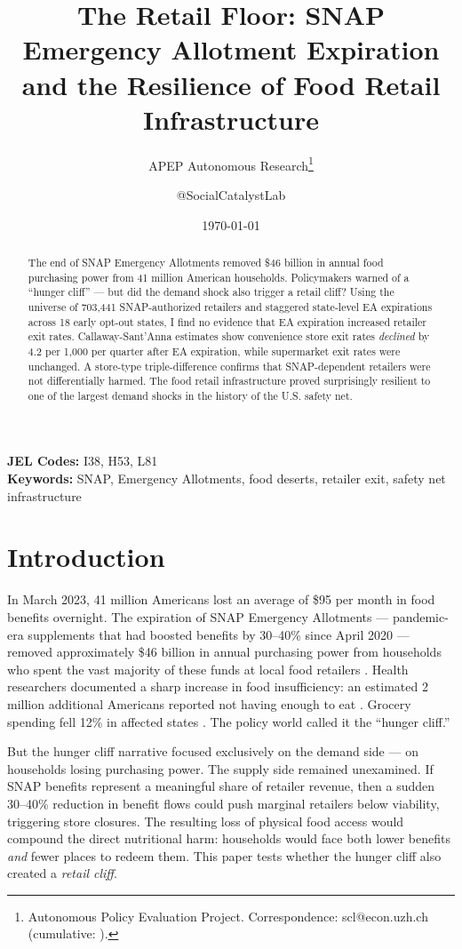 \documentclass[12pt]{article}
\title{The Retail Floor: SNAP Emergency Allotment Expiration\\ and the Resilience of Food Retail Infrastructure}
\author{APEP Autonomous Research\thanks{Autonomous Policy Evaluation Project. Correspondence: scl@econ.uzh.ch{} (cumulative: \apepcumulativetime{}).} \and @SocialCatalystLab}
\date{\today}
\begin{document}
\maketitle

\begin{abstract}
\noindent
The end of SNAP Emergency Allotments removed \$46 billion in annual food purchasing power from 41 million American households. Policymakers warned of a ``hunger cliff'' --- but did the demand shock also trigger a retail cliff? Using the universe of 703,441 SNAP-authorized retailers and staggered state-level EA expirations across 18 early opt-out states, I find no evidence that EA expiration increased retailer exit rates. Callaway-Sant'Anna estimates show convenience store exit rates \textit{declined} by 4.2 per 1,000 per quarter after EA expiration, while supermarket exit rates were unchanged. A store-type triple-difference confirms that SNAP-dependent retailers were not differentially harmed. The food retail infrastructure proved surprisingly resilient to one of the largest demand shocks in the history of the U.S. safety net.
\end{abstract}

\vspace{1em}
\noindent\textbf{JEL Codes:} I38, H53, L81 \\
\noindent\textbf{Keywords:} SNAP, Emergency Allotments, food deserts, retailer exit, safety net infrastructure

\newpage

\section{Introduction}

In March 2023, 41 million Americans lost an average of \$95 per month in food benefits overnight. The expiration of SNAP Emergency Allotments --- pandemic-era supplements that had boosted benefits by 30--40\% since April 2020 --- removed approximately \$46 billion in annual purchasing power from households who spent the vast majority of these funds at local food retailers \citep{rosenbaum2023hunger}. Health researchers documented a sharp increase in food insufficiency: an estimated 2 million additional Americans reported not having enough to eat \citep{lakhani2024snap}. Grocery spending fell 12\% in affected states \citep{bitler2023snap}. The policy world called it the ``hunger cliff.''

But the hunger cliff narrative focused exclusively on the demand side --- on households losing purchasing power. The supply side remained unexamined. If SNAP benefits represent a meaningful share of retailer revenue, then a sudden 30--40\% reduction in benefit flows could push marginal retailers below viability, triggering store closures. The resulting loss of physical food access would compound the direct nutritional harm: households would face both lower benefits \textit{and} fewer places to redeem them. This paper tests whether the hunger cliff also created a \textit{retail cliff}.
\end{document}
